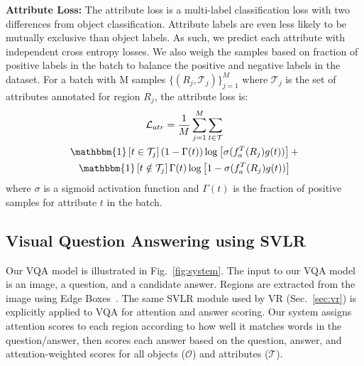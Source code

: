\documentclass[10pt,twocolumn,letterpaper]{article}
\begin{document}
\noindent
\textbf{Attribute Loss:} The attribute loss is a multi-label classification loss with two differences from object classification. Attribute labels are even less likely to be mutually exclusive than object labels. As such, we predict each attribute with independent cross entropy losses. We also weigh the samples based on fraction of positive labels in the batch to balance the positive and negative labels in the dataset. For a batch with M samples $\{(R_j,\mathcal{T}_j)\}_{j=1}^{M}$ where $\mathcal{T}_j$ is the set of attributes annotated for region $R_j$, the attribute loss is:
\vspace{-4mm}
\begin{multline}
\mathcal{L}_{atr} = \frac{1}{M}
\sum_{j=1}^{M} 
\sum_{t \in \mathcal{T}} \\
\mathbbm{1}\left[t \in \mathcal{T}_j\right](1-\Gamma(t))\log\left[\sigma(f_a^T(R_j)g(t))\right] + \\
\mathbbm{1}\left[t \notin \mathcal{T}_j\right]\Gamma(t)\log\left[1-\sigma(f_a^T(R_j)g(t))\right]
\end{multline}    
where $\sigma$ is a sigmoid activation function and $\Gamma(t)$ is the fraction of positive samples for attribute $t$ in the batch.


\vspace{-1mm}
\subsection{Visual Question Answering using SVLR} \label{sec:vqa}

Our VQA model is illustrated in Fig.~\ref{fig:system}.
The input to our VQA model is an image, a question, and a candidate answer. Regions are extracted from the image using Edge Boxes~\cite{zitnick2014edge}.  The same SVLR module used by VR (Sec.~\ref{sec:vr}) is explicitly applied to VQA for attention and answer scoring.  Our system assigns attention scores to each region according to how well it matches words in the question/answer, then scores each answer based on the question, answer, and attention-weighted scores for all objects ($\mathcal{O}$) and attributes ($\mathcal{T}$).
\end{document}
